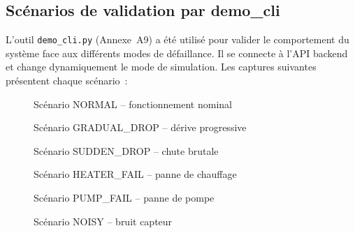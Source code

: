 \subsection{Scénarios de validation par demo\_cli}

L'outil \texttt{demo\_cli.py} (Annexe~A9) a été utilisé pour valider le comportement du système face aux différents modes de défaillance. Il se connecte à l'API backend et change dynamiquement le mode de simulation. Les captures suivantes présentent chaque scénario~:

\begin{figure}[htbp]
  \centering
  \caption{Scénario NORMAL -- fonctionnement nominal}
  \label{fig:demo_normal}
\end{figure}

\begin{figure}[htbp]
  \centering
  \caption{Scénario GRADUAL\_DROP -- dérive progressive}
  \label{fig:demo_gradual}
\end{figure}

\begin{figure}[htbp]
  \centering
  \caption{Scénario SUDDEN\_DROP -- chute brutale}
  \label{fig:demo_sudden}
\end{figure}

\begin{figure}[htbp]
  \centering
  \caption{Scénario HEATER\_FAIL -- panne de chauffage}
  \label{fig:demo_heater}
\end{figure}

\begin{figure}[htbp]
  \centering
  \caption{Scénario PUMP\_FAIL -- panne de pompe}
  \label{fig:demo_pump}
\end{figure}

\begin{figure}[htbp]
  \centering
  \caption{Scénario NOISY -- bruit capteur}
  \label{fig:demo_noisy}
\end{figure}

